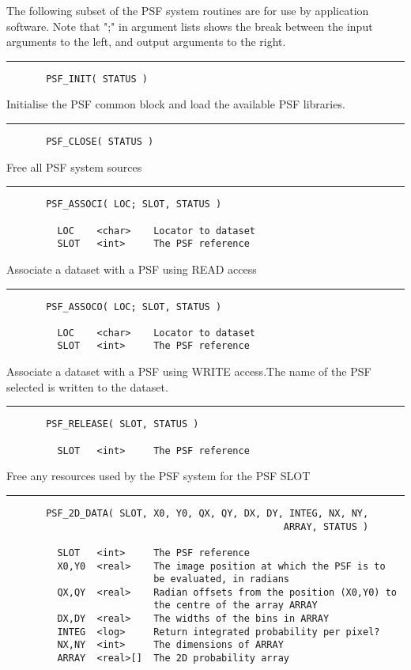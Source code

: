      The following subset of the PSF system routines are for use by
     application software. Note that ";" in argument lists shows
     the break between the input arguments to the left, and output
     arguments to the right.

\rule{\textwidth}{0.5mm}
\begin{verbatim}
       PSF_INIT( STATUS ) 
\end{verbatim}

         Initialise the PSF common block and load the available PSF
         libraries.

\rule{\textwidth}{0.5mm}
\begin{verbatim}
       PSF_CLOSE( STATUS )
\end{verbatim}

         Free all PSF system sources

\rule{\textwidth}{0.5mm}
\begin{verbatim}
       PSF_ASSOCI( LOC; SLOT, STATUS )
       
      	 LOC	<char>	  Locator to dataset
         SLOT   <int>     The PSF reference
\end{verbatim}

         Associate a dataset with a PSF using READ access

\rule{\textwidth}{0.5mm}
\begin{verbatim}
       PSF_ASSOCO( LOC; SLOT, STATUS )
       
      	 LOC	<char>	  Locator to dataset
         SLOT   <int>     The PSF reference
\end{verbatim}

         Associate a dataset with a PSF using WRITE access.The name
         of the PSF selected is written to the dataset.

\rule{\textwidth}{0.5mm}
\begin{verbatim}
       PSF_RELEASE( SLOT, STATUS )

         SLOT   <int>     The PSF reference
\end{verbatim}

         Free any resources used by the PSF system for the PSF SLOT

\rule{\textwidth}{0.5mm}
\begin{verbatim}
       PSF_2D_DATA( SLOT, X0, Y0, QX, QY, DX, DY, INTEG, NX, NY,
                                                 ARRAY, STATUS )

         SLOT   <int>     The PSF reference
         X0,Y0  <real>    The image position at which the PSF is to
                          be evaluated, in radians
         QX,QY  <real>    Radian offsets from the position (X0,Y0) to
                          the centre of the array ARRAY
         DX,DY  <real>    The widths of the bins in ARRAY
         INTEG  <log>     Return integrated probability per pixel?
         NX,NY  <int>     The dimensions of ARRAY
         ARRAY  <real>[]  The 2D probability array
\end{verbatim}

